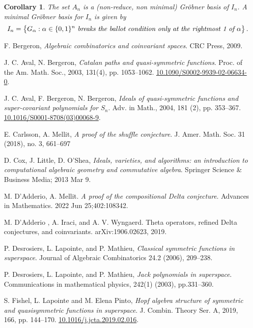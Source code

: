 \documentclass[11pt]{amsart}
\newtheorem{cor}[theorem]{Corollary}
\theoremstyle{definition}
\numberwithin{equation}{section}
\begin{document}
\begin{cor} The set $A_n$ is a (non-reduce, non minimal) Gr\"obner basis of $I_n$. A minimal Gr\"obner basis for $I_n$ is given by
$$ I_n =\big\{ G_\alpha : \alpha \in \{0,1\}^n \text{ \it breaks the ballot condition only
at the rightmost  1 of }  \alpha\big\}\,.
$$
\end{cor}


\vskip 1in

\begin{thebibliography}{999}

 F. Bergeron,
\textit{Algebraic combinatorics and coinvariant spaces}.
CRC Press, 2009.

 J. C. Aval, N. Bergeron,
\textit{Catalan paths and quasi-symmetric functions}.
Proc. of the Am. Math. Soc., 2003, 131(4), pp. 1053--1062.
\href{https://doi.org/10.1090/S0002-9939-02-06634-0}{10.1090/S0002-9939-02-06634-0}.

 J. C. Aval, F. Bergeron, N. Bergeron,
\textit{Ideals of quasi-symmetric functions and super-covariant polynomials for $S_n$}.
Adv. in Math., 2004, 181 (2), pp. 353--367.
\href{https://doi.org/10.1016/S0001-8708(03)00068-9}{10.1016/S0001-8708(03)00068-9}.

 E. Carlsson, A. Mellit,
\textit{A proof of the shuffle conjecture}.
J. Amer. Math. Soc. 31 (2018), no. 3, 661–697

 D. Cox, J. Little, D. O'Shea,
\textit{Ideals, varieties, and algorithms: an introduction to computational
algebraic geometry and commutative algebra}.
Springer Science \& Business Media; 2013 Mar 9.

 M. D'Adderio, A. Mellit.
\textit{A proof of the compositional Delta conjecture}.
Advances in Mathematics. 2022 Jun 25;402:108342.

 M. D'Adderio , A. Iraci, and A. V. Wyngaerd.
Theta operators, refined Delta conjectures, and
coinvariants. arXiv:1906.02623, 2019.

 P. Desrosiers, L. Lapointe, and P. Mathieu,
\textit{Classical symmetric functions in superspace}.
Journal of Algebraic Combinatorics 24.2 (2006), 209--238.

 P. Desrosiers, L. Lapointe, and P. Mathieu,
\textit{Jack polynomials in superspace}.
Communications in mathematical physics, 242(1) (2003), pp.331--360.

S. Fishel, L. Lapointe and M. Elena Pinto,
\textit{Hopf algebra structure of symmetric and quasisymmetric
              functions in superspace}.
 {J. Combin. Theory Ser. A}, 2019, 166, pp.  {144--170}.
\href{https://doi-org/10.1016/j.jcta.2019.02.016}{10.1016/j.jcta.2019.02.016}.


\end{thebibliography}
\end{document}
